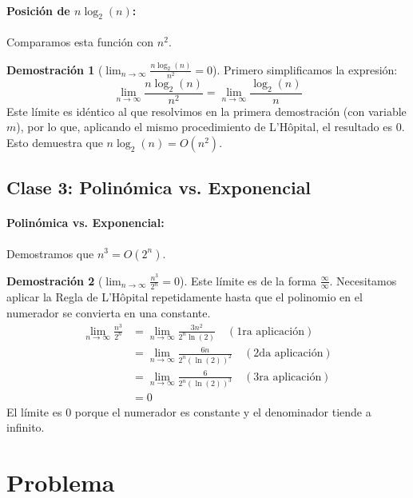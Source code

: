 \documentclass[12pt, a4paper]{article}
\theoremstyle{definition}
\newtheorem{demo}{Demostración}
\begin{document}
\paragraph{Posición de $n \log_2(n)$:} Comparamos esta función con $n^2$.

\begin{demo}[$\lim_{n \to \infty} \frac{n \log_2(n)}{n^2} = 0$]
Primero simplificamos la expresión:
\[ \lim_{n \to \infty} \frac{n \log_2(n)}{n^2} = \lim_{n \to \infty} \frac{\log_2(n)}{n} \]
Este límite es idéntico al que resolvimos en la primera demostración (con variable $m$), por lo que, aplicando el mismo procedimiento de L'Hôpital, el resultado es 0. Esto demuestra que $n \log_2(n) = O(n^2)$.
\end{demo}


\subsection{Clase 3: Polinómica vs. Exponencial}

\paragraph{Polinómica vs. Exponencial:} Demostramos que $n^3 = O(2^n)$.

\begin{demo}[$\lim_{n \to \infty} \frac{n^3}{2^n} = 0$]
Este límite es de la forma $\frac{\infty}{\infty}$. Necesitamos aplicar la Regla de L'Hôpital repetidamente hasta que el polinomio en el numerador se convierta en una constante.
\begin{align*}
    \lim_{n \to \infty} \frac{n^3}{2^n} &= \lim_{n \to \infty} \frac{3n^2}{2^n \ln(2)} \quad (\text{1ra aplicación}) \\
    &= \lim_{n \to \infty} \frac{6n}{2^n (\ln(2))^2} \quad (\text{2da aplicación}) \\
    &= \lim_{n \to \infty} \frac{6}{2^n (\ln(2))^3} \quad (\text{3ra aplicación}) \\
    &= 0
\end{align*}
El límite es 0 porque el numerador es constante y el denominador tiende a infinito.
\end{demo}








\section{Problema}
\end{document}
